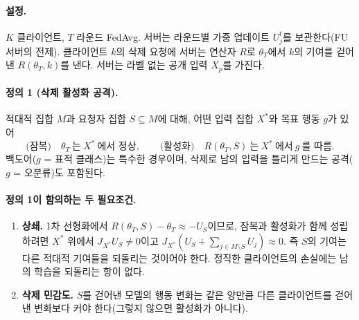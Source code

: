 \documentclass[10pt,a4paper]{article}
\begin{document}
\paragraph{설정.} $K$ 클라이언트, $T$ 라운드 FedAvg. 서버는 라운드별 가중 업데이트 $U_j^t$를 보관한다(FU 서버의 전제). 클라이언트 $k$의 삭제 요청에 서버는 연산자 $R$로 $\theta_T$에서 $k$의 기여를 걷어낸 $R(\theta_T,k)$를 낸다. 서버는 라벨 없는 공개 입력 $X_p$를 가진다.
\paragraph{정의 1 (삭제 활성화 공격).} 적대적 집합 $M$과 요청자 집합 $S\subseteq M$에 대해, 어떤 입력 집합 $X^*$와 목표 행동 $g$가 있어
\begin{equation}
\text{(잠복)}\quad \theta_T\ \text{는}\ X^*\ \text{에서 정상},\qquad \text{(활성화)}\quad R(\theta_T,S)\ \text{는}\ X^*\ \text{에서}\ g\ \text{를 따름}.
\end{equation}
백도어($g$ = 표적 클래스)는 특수한 경우이며, 삭제로 남의 입력을 틀리게 만드는 공격($g$ = 오분류)도 포함된다.
\paragraph{정의 1이 함의하는 두 필요조건.}
\begin{enumerate}[label=(\roman*)]
\item \textbf{상쇄.} 1차 선형화에서 $R(\theta_T,S)-\theta_T\approx-U_S$이므로, 잠복과 활성화가 함께 성립하려면 $X^*$ 위에서 $J_{X^*}U_S\neq0$이고 $J_{X^*}(U_S+\sum_{j\in M\setminus S}U_j)\approx0$. 즉 $S$의 기여는 다른 적대적 기여들을 되돌리는 것이어야 한다. 정직한 클라이언트의 손실에는 남의 학습을 되돌리는 항이 없다.
\item \textbf{삭제 민감도.} $S$를 걷어낸 모델의 행동 변화는 같은 양만큼 다른 클라이언트를 걷어낸 변화보다 커야 한다(그렇지 않으면 활성화가 아니다).
\end{enumerate}
\end{document}
